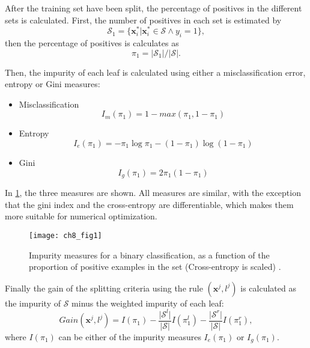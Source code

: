 After the training set have been split, the percentage of positives in the different sets is 
calculated. First, the number of positives in each set is estimated by
\begin{equation}
 \mathcal{S}_1 = \{\mathbf{x}_i^* \vert \mathbf{x}_i^* \in \mathcal{S} \wedge y_i =1 \},
\end{equation}
then the percentage of positives is calculates as
\begin{equation}
 \pi_1=\vert \mathcal{S}_1 \vert / \vert \mathcal{S} \vert.
\end{equation}

\newpage
Then, the impurity of each leaf is calculated using either a misclassification error, 
entropy or Gini measures:
\begin{itemize}
 \item  Misclassification
 \begin{equation}
 I_m(\pi_1)=1-max(\pi_1,1-\pi_1)
 \end{equation}
 
 \item Entropy
 \begin{equation}
 I_e(\pi_1)=-\pi_1\log \pi_1 -(1-\pi_1) \log (1-\pi_1)
 \end{equation}
 
 \item Gini
 \begin{equation}
 I_g(\pi_1)=2\pi_1(1-\pi_1)
 \end{equation}
\end{itemize}

In \figurename{ \ref{fig:8:impurity}}, the three measures are shown. All measures are similar, with 
the exception that the gini index and the cross-entropy are differentiable, which makes them
more suitable for numerical optimization.
\begin{figure}[t!]
\texttt{[image: ch8\_fig1]}
\caption{Impurity measures for a binary classification, as a function of the proportion of
positive examples in the set (Cross-entropy is scaled) \citep{Hastie2009}.}
\label{fig:8:impurity}
\end{figure} 

Finally the gain of the splitting criteria using the rule $(\mathbf{x}^j,l^j)$ is calculated as the 
impurity of $\mathcal{S}$ minus the weighted impurity of each leaf:
\begin{equation}\label{eq:8:gain}
  Gain(\mathbf{x}^j,l^j)=I(\pi_1)-\frac{\vert \mathcal{S}^l \vert}{\vert \mathcal{S} 
\vert}I(\pi^l_1)  -\frac{\vert \mathcal{S}^r \vert}{\vert \mathcal{S} \vert}I(\pi^r_1),
\end{equation} 
where $I(\pi_1)$ can be either of the impurity measures $I_e(\pi_1)$ or $I_g(\pi_1)$.

